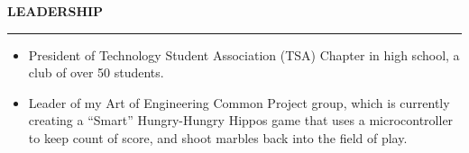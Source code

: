 \documentclass[11pt,letterpaper]{article}
\begin{document}

\medskip
\MakeUppercase{{\bf Leadership}} %
\medskip
\hrule %
\begin{list}{}{\setlength{\leftmargin}{0em}}
\item
\begin{itemize}
    \item President of Technology Student Association (TSA) Chapter in high school, a club of over 50 students.
    \item Leader of my Art of Engineering Common Project group, which is currently creating a ``Smart'' Hungry-Hungry Hippos game that uses a microcontroller to keep count of score, and shoot marbles back into the field of play.
\end{itemize}
\end{list}
\end{document}
